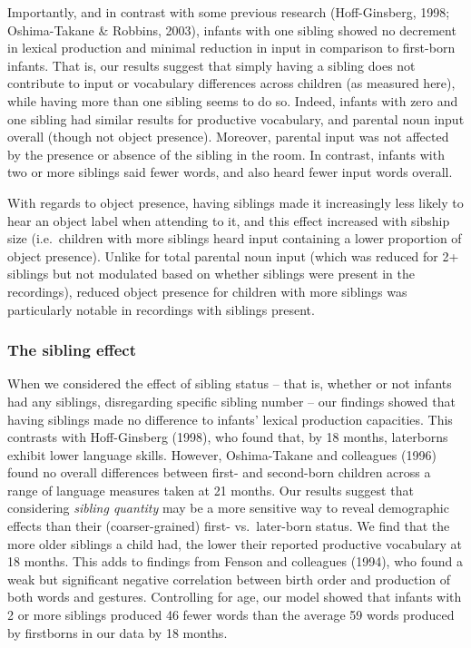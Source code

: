 \documentclass[
  man,mask,floatsintext]{apa6}
\begin{document}
Importantly, and in contrast with some previous research (Hoff-Ginsberg, 1998; Oshima-Takane \& Robbins, 2003), infants with one sibling showed no decrement in lexical production and minimal reduction in input in comparison to first-born infants. That is, our results suggest that simply having a sibling does not contribute to input or vocabulary differences across children (as measured here), while having more than one sibling seems to do so. Indeed, infants with zero and one sibling had similar results for productive vocabulary, and parental noun input overall (though not object presence). Moreover, parental input was not affected by the presence or absence of the sibling in the room. In contrast, infants with two or more siblings said fewer words, and also heard fewer input words overall.

With regards to object presence, having siblings made it increasingly less likely to hear an object label when attending to it, and this effect increased with sibship size (i.e.~children with more siblings heard input containing a lower proportion of object presence). Unlike for total parental noun input (which was reduced for 2+ siblings but not modulated based on whether siblings were present in the recordings), reduced object presence for children with more siblings was particularly notable in recordings with siblings present.

\hypertarget{the-sibling-effect}{%
\subsubsection{The sibling effect}\label{the-sibling-effect}}

When we considered the effect of sibling status -- that is, whether or not infants had any siblings, disregarding specific sibling number -- our findings showed that having siblings made no difference to infants' lexical production capacities. This contrasts with Hoff-Ginsberg (1998), who found that, by 18 months, laterborns exhibit lower language skills. However, Oshima-Takane and colleagues (1996) found no overall differences between first- and second-born children across a range of language measures taken at 21 months. Our results suggest that considering \emph{sibling quantity} may be a more sensitive way to reveal demographic effects than their (coarser-grained) first- vs.~later-born status. We find that the more older siblings a child had, the lower their reported productive vocabulary at 18 months. This adds to findings from Fenson and colleagues (1994), who found a weak but significant negative correlation between birth order and production of both words and gestures. Controlling for age, our model showed that infants with 2 or more siblings produced 46 fewer words than the average 59 words produced by firstborns in our data by 18 months.
\end{document}
